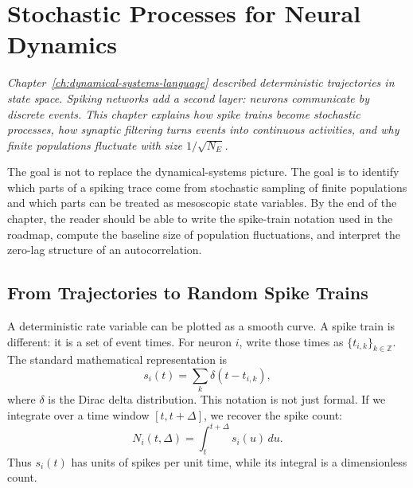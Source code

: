 \chapter{Stochastic Processes for Neural Dynamics}
\label{ch:stochastic-processes-neural-dynamics}

\textit{Chapter~\ref{ch:dynamical-systems-language} described deterministic trajectories in state space. Spiking networks add a second layer: neurons communicate by discrete events. This chapter explains how spike trains become stochastic processes, how synaptic filtering turns events into continuous activities, and why finite populations fluctuate with size $1/\sqrt{N_E}$.}

The goal is not to replace the dynamical-systems picture. The goal is to identify which parts of a spiking trace come from stochastic sampling of finite populations and which parts can be treated as mesoscopic state variables. By the end of the chapter, the reader should be able to write the spike-train notation used in the roadmap, compute the baseline size of population fluctuations, and interpret the zero-lag structure of an autocorrelation.

\section{From Trajectories to Random Spike Trains}
\label{sec:from-trajectories-to-spikes}

A deterministic rate variable can be plotted as a smooth curve. A spike train is different: it is a set of event times. For neuron $i$, write those times as $\{t_{i,k}\}_{k\in\mathbb{Z}}$. The standard mathematical representation is
%
\begin{equation}
  s_i(t) = \sum_k \delta(t-t_{i,k}),
  \label{eq:single-spike-train}
\end{equation}
%
where $\delta$ is the Dirac delta distribution. This notation is not just formal. If we integrate over a time window $[t,t+\Delta]$, we recover the spike count:
%
\begin{equation}
  N_i(t,\Delta)
  =
  \int_t^{t+\Delta} s_i(u)\,du.
  \label{eq:spike-count-window}
\end{equation}
%
Thus $s_i(t)$ has units of spikes per unit time, while its integral is a dimensionless count.

